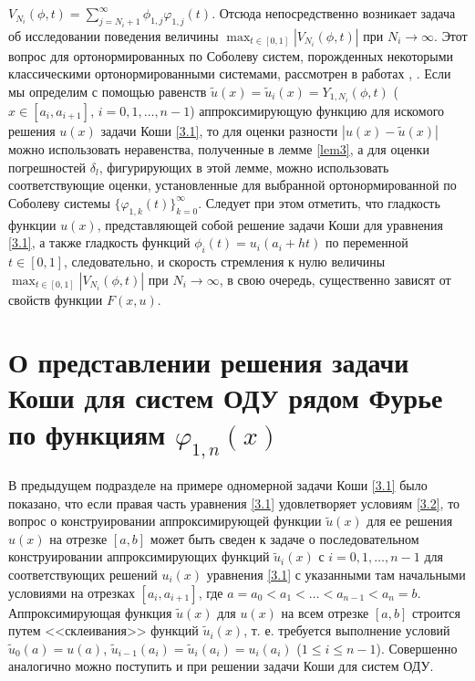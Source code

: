 $V_{N_i}(\phi,t)=\sum\nolimits_{j=N_i+1}^\infty \hat \phi_{1,j}\varphi_{1,j}(t)$. Отсюда непосредственно возникает задача об исследовании поведения величины $\max_{t\in[0,1]}|V_{N_i}(\phi,t)|$ при $N_i\to\infty$.  Этот вопрос  для   ортонормированных по Соболеву систем, порожденных некоторыми классическими ортонормированными системами, рассмотрен в работах  \cite{Shar11, Shar2003, Shar2006, Shar2008, Shar19, Shar18, sharap3, Shar_Dag_Elec, SHII, Shar2017, SharSMJ2017}, \cite{SharIzv2018}.
Если мы определим  с помощью равенств $\tilde u(x)=\tilde u_i(x)=Y_{1,N_i}(\phi, t)$  ($x\in [a_i,a_{i+1}]$, $i=0,1,\ldots, n-1$)  аппроксимирующую функцию для искомого решения $u(x)$  задачи Коши \eqref{3.1}, то для оценки  разности $|u(x)-\tilde u(x)|$  можно использовать неравенства, полученные в лемме \ref{lem3}, а для оценки погрешностей $\delta_l$, фигурирующих в этой лемме, можно использовать соответствующие оценки, установленные для выбранной ортонормированной по Соболеву системы $\{\varphi_{1,k}(t)\}_{k=0}^\infty$. Следует при этом отметить, что гладкость функции $u(x)$, представляющей собой решение задачи Коши для уравнения \eqref{3.1}, а также   гладкость функций $\phi_i(t)=u_i(a_i+ht)$ по переменной  $t\in[0,1]$,  следовательно, и скорость стремления к нулю величины $\max_{t\in[0,1]}|V_{N_i}(\phi,t)|$ при $N_i\to\infty$,  в свою очередь, существенно зависят от свойств функции $F(x,u)$.


\section{О представлении решения задачи Коши для систем ОДУ рядом Фурье по функциям $\varphi_{1,n}(x)$}\label{CauchyProblemSolutionRepr}
В предыдущем подразделе на примере одномерной задачи Коши \eqref{3.1} было показано, что если правая часть уравнения \eqref{3.1} удовлетворяет условиям \eqref{3.2}, то вопрос о конструировании аппроксимирующей функции $\tilde u(x)$ для ее решения $u(x)$ на отрезке $[a,b]$ может быть  сведен к задаче о последовательном  конструировании аппроксимирующих функций $\tilde u_i(x)$ с $i=0, 1,\ldots, n-1$ для соответствующих   решений $u_i(x)$ уравнения \eqref{3.1} с указанными там начальными условиями на  отрезках $[a_i,a_{i+1}]$, где $a=a_0<a_1<\ldots<a_{n-1}<a_n=b$. Аппроксимирующая функция $\tilde u(x)$ для $u(x)$ на всем отрезке $[a,b]$ строится путем <<склеивания>> функций $\tilde u_i(x)$, т. е. требуется выполнение условий $\tilde u_0(a)=u(a)$,
$\tilde u_{i-1}(a_i)=\tilde u_i(a_i)=u_i(a_i)$ ($1\le i\le n-1$). Совершенно аналогично можно поступить и при решении задачи Коши для систем ОДУ.

